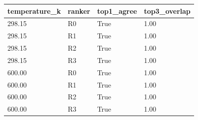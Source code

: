 \begin{tabular}{llll}
\hline
temperature\_k & ranker & top1\_agree & top3\_overlap \\
\hline
298.15 & R0 & True & 1.00 \\
298.15 & R1 & True & 1.00 \\
298.15 & R2 & True & 1.00 \\
298.15 & R3 & True & 1.00 \\
600.00 & R0 & True & 1.00 \\
600.00 & R1 & True & 1.00 \\
600.00 & R2 & True & 1.00 \\
600.00 & R3 & True & 1.00 \\
\hline
\end{tabular}
